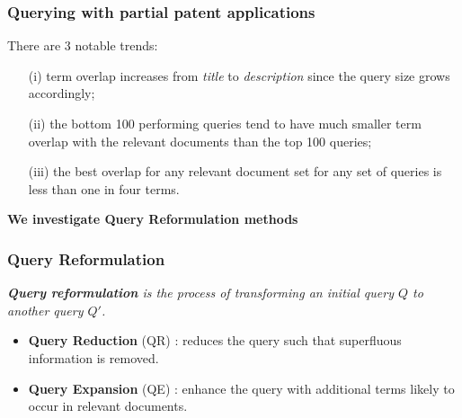 \documentclass[xcolor=x11names,compress]{beamer}
\renewcommand{\(}{\begin{columns}}
\renewcommand{\)}{\end{columns}}
\newcommand{\<}[1]{\begin{column}{#1}}
\renewcommand{\>}{\end{column}}
\begin{document}
\begin{frame}
\frametitle{Querying with partial patent applications}
There are 3 notable trends:
\begin{itemize}
\item[(i)]   term overlap increases from \textit{title} to \textit{description}
since the query size grows accordingly; 
\item[(ii)]  the bottom 100 performing queries tend to have much smaller term overlap with the relevant documents than the top 100 queries; 
\item[(iii)] the best overlap for any relevant
document set for any set of queries is less than one in four terms.
\end{itemize}

\begin{center}
{\color{DeepSkyBlue4}\textbf{We investigate Query Reformulation methods}}
\end{center}
\end{frame}



\begin{frame}
\frametitle{Query Reformulation}

{\color{DeepSkyBlue4}\textit{\textbf{Query reformulation} is the process of transforming an initial query $Q$ to another query $Q'$.}}

\begin{itemize}
\item \textbf{Query Reduction} (QR) \citep{Kumaran2009}: reduces the query such that superfluous information is removed.
\item \textbf{Query Expansion} (QE) \citep{Efthimiadis1996}: enhance the query with additional terms likely to occur in relevant documents.
\end{itemize}

\end{frame}
\end{document}
